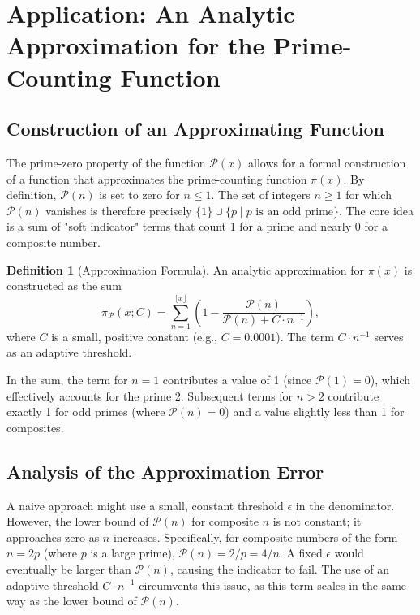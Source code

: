 \documentclass[11pt,a4paper]{amsart}
\newcommand{\Px}{\mathcal{P}}
\theoremstyle{plain}
\theoremstyle{definition}
\newtheorem{definition}[theorem]{Definition}
\begin{document}
\section{Application: An Analytic Approximation for the Prime-Counting Function}

\subsection{Construction of an Approximating Function}
The prime-zero property of the function $\Px(x)$ allows for a formal construction of a function that approximates the prime-counting function $\pi(x)$. By definition, $\Px(n)$ is set to zero for $n \le 1$. The set of integers $n \ge 1$ for which $\Px(n)$ vanishes is therefore precisely $\{1\} \cup \{p \mid p \text{ is an odd prime}\}$.
The core idea is a sum of "soft indicator" terms that count 1 for a prime and nearly 0 for a composite number.

\begin{definition}[Approximation Formula]\label{def:pi_approx}
An analytic approximation for $\pi(x)$ is constructed as the sum
\begin{equation}\label{eq:pi_P_adaptive}
\pi_\Px(x; C) = \sum_{n=1}^{\lfloor x \rfloor} \left(1 - \frac{\Px(n)}{\Px(n) + C \cdot n^{-1}}\right),
\end{equation}
where $C$ is a small, positive constant (e.g., $C=0.0001$). The term $C \cdot n^{-1}$ serves as an adaptive threshold.
\end{definition}

In the sum, the term for $n=1$ contributes a value of 1 (since $\Px(1)=0$), which effectively accounts for the prime 2. Subsequent terms for $n>2$ contribute exactly 1 for odd primes (where $\Px(n)=0$) and a value slightly less than 1 for composites.

\subsection{Analysis of the Approximation Error}
A naive approach might use a small, constant threshold $\epsilon$ in the denominator. However, the lower bound of $\Px(n)$ for composite $n$ is not constant; it approaches zero as $n$ increases. Specifically, for composite numbers of the form $n=2p$ (where $p$ is a large prime), $\Px(n) = 2/p = 4/n$. A fixed $\epsilon$ would eventually be larger than $\Px(n)$, causing the indicator to fail. The use of an adaptive threshold $C \cdot n^{-1}$ circumvents this issue, as this term scales in the same way as the lower bound of $\Px(n)$.
\end{document}
